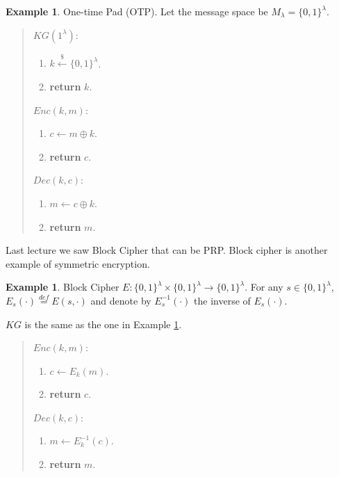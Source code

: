 \documentclass[12pt]{article}
\newcommand{\eqdef}{\stackrel{def}{=}}
\newcommand{\bits}{\{0,1\}}
\newcommand{\getsr}{\stackrel{\$}{\gets}}
\theoremstyle{definition}
\newtheorem{example}[theorem]{Example}
\begin{document}
\begin{example}
\label{eg:1}
One-time Pad (OTP). Let the message space be $M_\lambda = \bits^\lambda$.

\begin{quote}
\centering
\begin{minipage}{.25\textwidth}
$KG(1^\lambda)$:
\begin{enumerate}
\item $k \getsr \bits^\lambda$.
\item {\bf return} $k$.
\end{enumerate}
\end{minipage}
\hspace{.1in}
\begin{minipage}{.25\textwidth}
$Enc(k, m)$:
\begin{enumerate}
\item $c \gets m \oplus k$.
\item {\bf return} $c$.
\end{enumerate}
\end{minipage}
\hspace{.1in}
\begin{minipage}{.25\textwidth}
$Dec(k, c)$:
\begin{enumerate}
\item $m \gets c \oplus k$.
\item {\bf return} $m$.
\end{enumerate}
\end{minipage}
\end{quote}

\end{example}

Last lecture we saw Block Cipher that can be PRP. Block cipher is another example of symmetric encryption.

\begin{example}
\label{eg:bc}
Block Cipher $E : \bits^\lambda \times \bits^\lambda \to \bits^\lambda$. For any $s \in \bits^\lambda$, $E_s(\cdot) \eqdef E(s,\cdot)$ and denote by $E_s^{-1}(\cdot)$ the inverse of $E_s(\cdot)$.

$KG$ is the same as the one in Example \ref{eg:1}.

\begin{quote}
\centering
\begin{minipage}{.4\textwidth}
$Enc(k, m)$:
\begin{enumerate}
\item $c \gets E_k(m)$.
\item {\bf return} $c$.
\end{enumerate}
\end{minipage}
\hspace{.1in}
\begin{minipage}{.4\textwidth}
$Dec(k, c)$:
\begin{enumerate}
\item $m \gets E_k^{-1}(c)$.
\item {\bf return} $m$.
\end{enumerate}
\end{minipage}
\end{quote}

\end{example}
\end{document}
